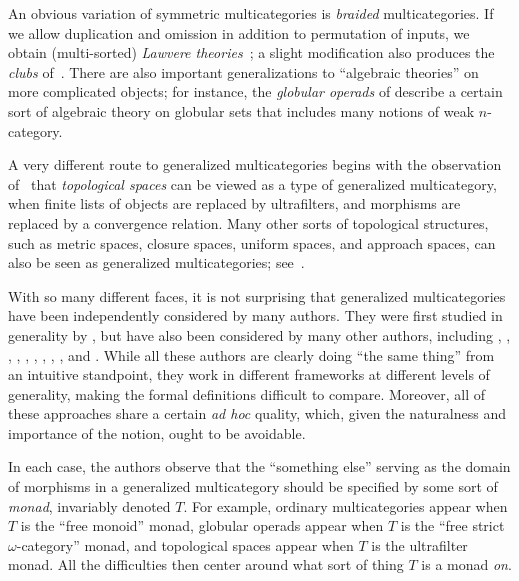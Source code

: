 \documentclass{tac}
\numberwithin{equation}{section}
\begin{document}
An obvious variation of symmetric multicategories is \emph{braided}
multicategories.  If we
allow duplication and omission in addition to permutation of inputs,
we obtain (multi-sorted) \emph{Lawvere
  theories}~\cite{lawvere:functsem}; a slight modification also
produces the \emph{clubs} of~\cite{kelly:mv-funct-calc,kelly:clubs}.
There are also important generalizations to ``algebraic theories'' on
more complicated objects; for instance, the \emph{globular operads} of
\cite{batanin:monglob,leinster:higher-opds} describe a certain sort of
algebraic theory on globular sets that includes many notions of
weak $n$-category.

A very different route to generalized multicategories begins with the
observation of~\cite{RelationalAlgebras} that \emph{topological
  spaces} can be viewed as a type of generalized multicategory, when
finite lists of objects are replaced by ultrafilters, and morphisms
are replaced by a convergence relation.  Many other sorts of
topological structures, such as metric spaces,
closure spaces, uniform spaces, and approach spaces, can also be seen
as generalized multicategories;
see~\cite{LawvereMetric,CommonApproach,OneSetting}.

With so many different faces, it is not surprising that generalized
multicategories have been independently considered by many authors.
They were first studied in generality by \cite{burroni:t-cats},
but have also been considered by many other
authors, including \cite{leinster:higher-opds},
\cite{GeneralizedEnrichmentofCategories}, \cite{HermidaCoherent},
\cite{CommonApproach}, \cite{OneSetting}, \cite{RelationalAlgebras},
\cite{weber:operads}, \cite{bd:hda3}, \cite{cheng:opetopic}, and
\cite{ds:lmpo-conv}.  While
all these authors are clearly doing ``the same thing'' from an intuitive
standpoint, they work in different frameworks at different
levels of generality, making the formal definitions difficult to compare.
Moreover, all of these approaches share a
certain \emph{ad hoc} quality, which, given the naturalness and
importance of the notion, ought to be avoidable.

In each case, the authors observe that the ``something else''
serving as the domain of morphisms in a generalized multicategory
should be specified by some sort of \emph{monad}, invariably denoted
$T$.  For example, ordinary multicategories appear when $T$ is the
``free monoid'' monad, globular operads appear when $T$ is the
``free strict $\omega$-category'' monad, and topological spaces appear
when $T$ is the ultrafilter monad.  All the difficulties then center
around what sort of thing $T$ is a monad \emph{on}.
\end{document}
